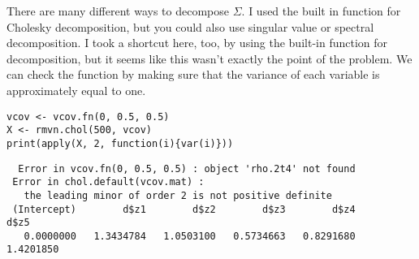 \documentclass{article}
\begin{document}
\noindent There are many different ways to decompose $\Sigma$.  I used the built in function for Cholesky decomposition, but you could also use singular value or spectral decomposition.  I took a shortcut here, too, by using the built-in function for decomposition, but it seems like this wasn't exactly the point of the problem.  We can check the function by making sure that the variance of each variable is approximately equal to one.


\begin{verbatim}
vcov <- vcov.fn(0, 0.5, 0.5)
X <- rmvn.chol(500, vcov)
print(apply(X, 2, function(i){var(i)}))
\end{verbatim}

\begin{verbatim}
  Error in vcov.fn(0, 0.5, 0.5) : object 'rho.2t4' not found
 Error in chol.default(vcov.mat) : 
   the leading minor of order 2 is not positive definite
 (Intercept)        d$z1        d$z2        d$z3        d$z4        d$z5 
   0.0000000   1.3434784   1.0503100   0.5734663   0.8291680   1.4201850
\end{verbatim}
\end{document}
